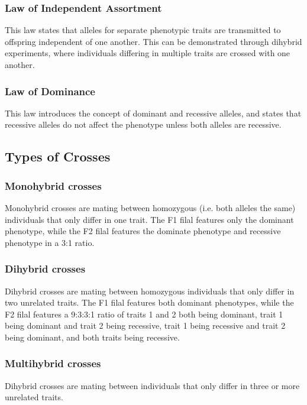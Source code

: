 \documentclass[12pt,titlepage]{article}
\begin{document}
      \subsubsection{Law of Independent Assortment}
        This law states that alleles for separate phenotypic traits are transmitted to offspring independent of one another. This can be demonstrated
        through dihybrid experiments, where individuals differing in multiple traits are crossed with one another.

      \subsubsection{Law of Dominance}
        This law introduces the concept of dominant and recessive alleles, and states that recessive alleles do not affect the phenotype unless
        both alleles are recessive.

    \subsection{Types of Crosses}
      \subsubsection{Monohybrid crosses}
        Monohybrid crosses are mating between homozygous (i.e. both alleles the same) individuals that only differ in one trait.
        The F1 filal features only the dominant phenotype, while the F2 filal features the dominate phenotype and recessive phenotype in a 3:1 ratio.

      \subsubsection{Dihybrid crosses}
        Dihybrid crosses are mating between homozygous individuals that only differ in two unrelated traits. The F1 filal features both dominant phenotypes, while
        the F2 filal features a 9:3:3:1 ratio of traits 1 and 2 both being dominant, trait 1 being dominant and trait 2 being recessive,
        trait 1 being recessive and trait 2 being dominant, and both traits being recessive.

      \subsubsection{Multihybrid crosses}
        Dihybrid crosses are mating between individuals that only differ in three or more unrelated traits.
\end{document}
